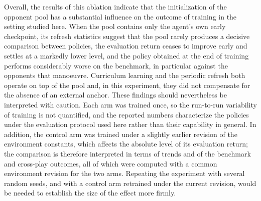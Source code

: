 Overall, the results of this ablation indicate that the initialization of the opponent pool has a substantial influence on the outcome of training in the setting studied here. When the pool contains only the agent's own early checkpoint, its refresh statistics suggest that the pool rarely produces a decisive comparison between policies, the evaluation return ceases to improve early and settles at a markedly lower level, and the policy obtained at the end of training performs considerably worse on the benchmark, in particular against the opponents that manoeuvre. Curriculum learning and the periodic refresh both operate on top of the pool and, in this experiment, they did not compensate for the absence of an external anchor. These findings should nevertheless be interpreted with caution. Each arm was trained once, so the run-to-run variability of training is not quantified, and the reported numbers characterize the policies under the evaluation protocol used here rather than their capability in general. In addition, the control arm was trained under a slightly earlier revision of the environment constants, which affects the absolute level of its evaluation return; the comparison is therefore interpreted in terms of trends and of the benchmark and cross-play outcomes, all of which were computed with a common environment revision for the two arms. Repeating the experiment with several random seeds, and with a control arm retrained under the current revision, would be needed to establish the size of the effect more firmly.
